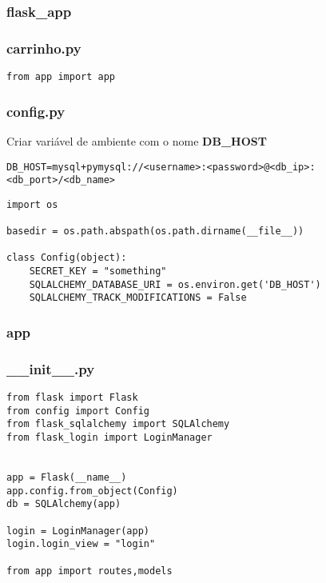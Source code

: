 \documentclass{report}
\begin{document}
\subsubsection{flask\_app}

\subsubsection{carrinho.py}
\begin{lstlisting}
from app import app
\end{lstlisting}


\subsubsection{config.py}
Criar variável de ambiente com o nome \textbf{DB\_HOST}
\begin{lstlisting}
DB_HOST=mysql+pymysql://<username>:<password>@<db_ip>:<db_port>/<db_name>
\end{lstlisting}

\begin{lstlisting}
import os

basedir = os.path.abspath(os.path.dirname(__file__))

class Config(object):
	SECRET_KEY = "something"
	SQLALCHEMY_DATABASE_URI = os.environ.get('DB_HOST')
	SQLALCHEMY_TRACK_MODIFICATIONS = False

\end{lstlisting}

\subsubsection{app}
\subsubsection{\_\_init\_\_.py}
\begin{lstlisting}
from flask import Flask
from config import Config
from flask_sqlalchemy import SQLAlchemy
from flask_login import LoginManager


app = Flask(__name__)
app.config.from_object(Config)
db = SQLAlchemy(app)

login = LoginManager(app)
login.login_view = "login"

from app import routes,models
\end{lstlisting}
\end{document}
